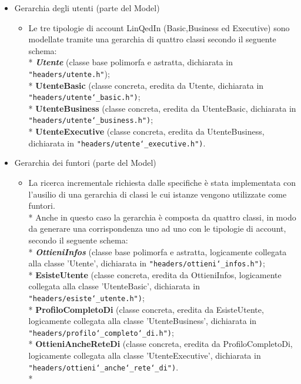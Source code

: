 \documentclass{article}
\begin{document}
\begin{itemize}
	\item Gerarchia degli utenti (parte del Model)
		\begin{itemize}
		\renewcommand\labelitemi{-}
			\item Le tre tipologie di account LinQedIn (Basic,Business ed Executive)
				  sono modellate tramite una gerarchia di quattro classi secondo il seguente schema: \\*
				  \textbf{\textit{Utente}} (classe base polimorfa e astratta, dichiarata in \texttt{"headers/utente.h"});\\*   
				  \textbf{UtenteBasic} (classe concreta, eredita da Utente, dichiarata in \texttt{"headers/utente\char`_basic.h")}; \\*
				  \textbf{UtenteBusiness} (classe concreta, eredita da UtenteBasic, dichiarata in \texttt{"headers/utente\char`_business.h")};\\*
				  \textbf{UtenteExecutive} (classe concreta, eredita da UtenteBusiness, dichiarata in \texttt{"headers/utente\char`_executive.h")}. 
		\end{itemize}
	
	\item Gerarchia dei funtori (parte del Model)
		\begin{itemize}
		\renewcommand\labelitemi{-}
			\item La ricerca incrementale richiesta dalle specifiche è stata implementata con l'ausilio
				  di una gerarchia di classi le cui istanze vengono utilizzate come funtori.\\*
				  Anche in questo caso la gerarchia è composta da quattro classi, in modo da generare 
				  una corrispondenza uno ad uno con le tipologie di account, secondo il seguente schema: \\*
				  \textbf{\textit{OttieniInfos}} (classe base polimorfa e astratta, logicamente collegata alla classe 'Utente', dichiarata in \texttt{"headers/ottieni\char`_infos.h")};  \\*
				  \textbf{EsisteUtente} (classe concreta, eredita da OttieniInfos, logicamente collegata alla classe 'UtenteBasic', dichiarata in \texttt{"headers/esiste\char`_utente.h")}; \\*
				  \textbf{ProfiloCompletoDi} (classe concreta, eredita da EsisteUtente, logicamente collegata alla classe 'UtenteBusiness', dichiarata in \texttt{"headers/profilo\char`_completo\char`_di.h")}; \\*
				  \textbf{OttieniAncheReteDi} (classe concreta, eredita da ProfiloCompletoDi, logicamente collegata alla classe 'UtenteExecutive', dichiarata in \texttt{"headers/ottieni\char`_anche\char`_rete\char`_di")}. \\*
		\end{itemize}
			

\end{itemize}
\end{document}
